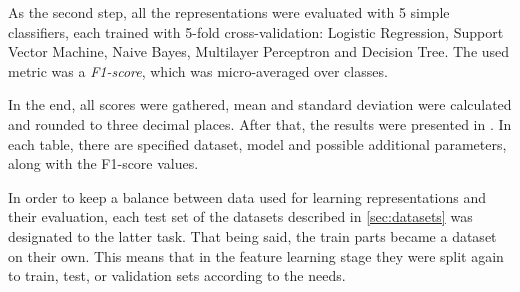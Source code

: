 \vspace{\baselineskip}
As the second step, all the representations were evaluated with 5 simple classifiers, each trained with 5-fold cross-validation: Logistic Regression, Support Vector Machine, Naive Bayes, Multilayer Perceptron and Decision Tree. The used metric was a \textit{F1-score}, which was micro-averaged over classes.

\vspace{\baselineskip}
In the end, all scores were gathered, mean and standard deviation were calculated and rounded to three decimal places. After that, the results were presented in . In each table, there are specified dataset, model and possible additional parameters, along with the F1-score values.

\vspace{\baselineskip}
In order to keep a balance between data used for learning representations and their evaluation, each test set of the datasets described in \autoref{sec:datasets} was designated to the latter task. That being said, the train parts became a dataset on their own. This means that in the feature learning stage they were split again to train, test, or validation sets according to the needs.
